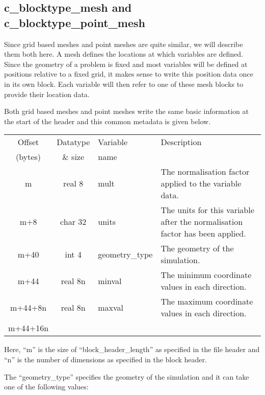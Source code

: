 \documentclass[12pt]{article}
\begin{document}
\subsection{c\_blocktype\_mesh and c\_blocktype\_point\_mesh}

Since grid based meshes and point meshes are quite similar, we will describe
them both here. A mesh defines the locations at which variables are defined.
Since the geometry of a problem is fixed and most variables will be defined
at positions relative to a fixed grid, it makes sense to write this position
data once in its own block. Each variable will then refer to one of these
mesh blocks to provide their location data.

Both grid based meshes and point meshes write the same basic information
at the start of the header and this common metadata is given below.\\

\begin{center}
\begin{tabularx}{0.9\textwidth}[!hbt]{cclX}
  Offset & Datatype & Variable & Description\\
  (bytes) & \& size & name &
  \\\toprule

  m & real 8 & mult & The normalisation factor applied to the variable data.
  \\\midrule

  m+8 & char 32 & units & The units for this variable after the normalisation
  factor has been applied.
  \\\midrule

  m+40 & int 4 & geometry\_type & The geometry of the simulation.
  \\\midrule

  m+44 & real 8n & minval & The minimum coordinate values in each direction.
  \\\midrule

  m+44+8n & real 8n & maxval & The maximum coordinate values in each
  direction.
  \\\midrule

  m+44+16n &
\end{tabularx}
\end{center}\vspace{10pt}

Here, ``m'' is the size of ``block\_header\_length'' as specified in the file
header and ``n'' is the number of dimensions as specified in the block header.

The ``geometry\_type'' specifies the geometry of the simulation and it can
take one of the following values:\\
\end{document}
